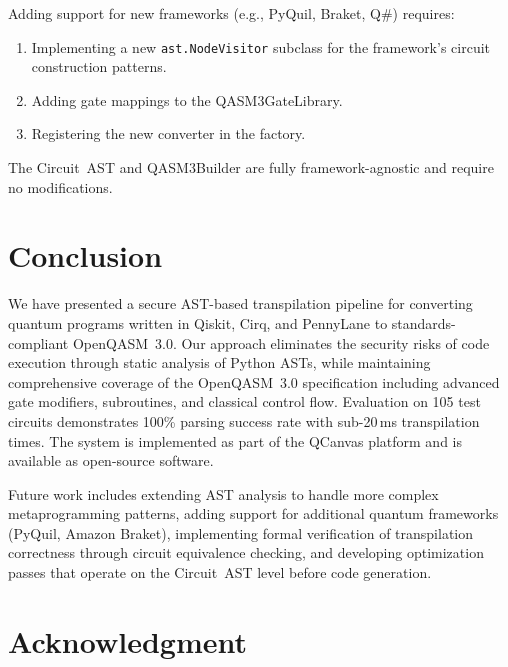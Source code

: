 \documentclass[conference]{IEEEtran}
\begin{document}
Adding support for new frameworks (e.g., PyQuil, Braket, Q\#) requires:
\begin{enumerate}
    \item Implementing a new \texttt{ast.NodeVisitor} subclass for the framework's circuit construction patterns.
    \item Adding gate mappings to the QASM3GateLibrary.
    \item Registering the new converter in the factory.
\end{enumerate}

The Circuit~AST and QASM3Builder are fully framework-agnostic and require no modifications.

\section{Conclusion}
\label{sec:conclusion}

We have presented a secure AST-based transpilation pipeline for converting quantum programs written in Qiskit, Cirq, and PennyLane to standards-compliant OpenQASM~3.0. Our approach eliminates the security risks of code execution through static analysis of Python ASTs, while maintaining comprehensive coverage of the OpenQASM~3.0 specification including advanced gate modifiers, subroutines, and classical control flow. Evaluation on 105 test circuits demonstrates 100\% parsing success rate with sub-20\,ms transpilation times. The system is implemented as part of the QCanvas platform and is available as open-source software.

Future work includes extending AST analysis to handle more complex metaprogramming patterns, adding support for additional quantum frameworks (PyQuil, Amazon Braket), implementing formal verification of transpilation correctness through circuit equivalence checking, and developing optimization passes that operate on the Circuit~AST level before code generation.

\section*{Acknowledgment}
\end{document}

